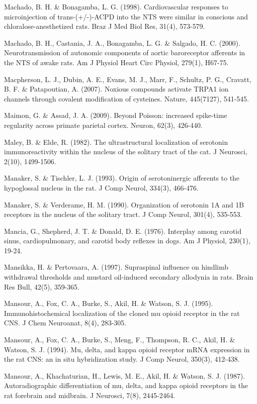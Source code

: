 \documentclass[a4paper,12pt,twoside]{report}
\begin{document}
\begin{singlespacing}
\begin{footnotesize}
Machado, B. H. \& Bonagamba, L. G. (1998). Cardiovascular responses to microinjection of trans-(+/-)-ACPD into the NTS were similar in conscious and chloralose-anesthetized rats. Braz J Med Biol Res, 31(4), 573-579.

Machado, B. H., Castania, J. A., Bonagamba, L. G. \& Salgado, H. C. (2000). Neurotransmission of autonomic components of aortic baroreceptor afferents in the NTS of awake rats. Am J Physiol Heart Circ Physiol, 279(1), H67-75.

Macpherson, L. J., Dubin, A. E., Evans, M. J., Marr, F., Schultz, P. G., Cravatt, B. F. \& Patapoutian, A. (2007). Noxious compounds activate TRPA1 ion channels through covalent modification of cysteines. Nature, 445(7127), 541-545.

Maimon, G. \& Assad, J. A. (2009). Beyond Poisson: increased spike-time regularity across primate parietal cortex. Neuron, 62(3), 426-440.

Maley, B. \& Elde, R. (1982). The ultrastructural localization of serotonin immunoreactivity within the nucleus of the solitary tract of the cat. J Neurosci, 2(10), 1499-1506.

Manaker, S. \& Tischler, L. J. (1993). Origin of serotoninergic afferents to the hypoglossal nucleus in the rat. J Comp Neurol, 334(3), 466-476.

Manaker, S. \& Verderame, H. M. (1990). Organization of serotonin 1A and 1B receptors in the nucleus of the solitary tract. J Comp Neurol, 301(4), 535-553.

Mancia, G., Shepherd, J. T. \& Donald, D. E. (1976). Interplay among carotid sinus, cardiopulmonary, and carotid body reflexes in dogs. Am J Physiol, 230(1), 19-24.

Mansikka, H. \& Pertovaara, A. (1997). Supraspinal influence on hindlimb withdrawal thresholds and mustard oil-induced secondary allodynia in rats. Brain Res Bull, 42(5), 359-365.

Mansour, A., Fox, C. A., Burke, S., Akil, H. \& Watson, S. J. (1995). Immunohistochemical localization of the cloned mu opioid receptor in the rat CNS. J Chem Neuroanat, 8(4), 283-305.

Mansour, A., Fox, C. A., Burke, S., Meng, F., Thompson, R. C., Akil, H. \& Watson, S. J. (1994). Mu, delta, and kappa opioid receptor mRNA expression in the rat CNS: an in situ hybridization study. J Comp Neurol, 350(3), 412-438.

Mansour, A., Khachaturian, H., Lewis, M. E., Akil, H. \& Watson, S. J. (1987). Autoradiographic differentiation of mu, delta, and kappa opioid receptors in the rat forebrain and midbrain. J Neurosci, 7(8), 2445-2464.


\end{footnotesize}
\end{singlespacing}
\end{document}
